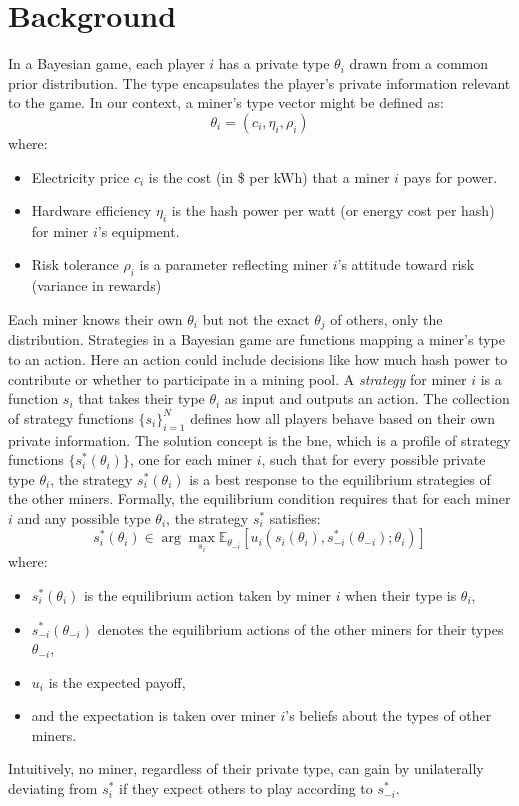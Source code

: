 \documentclass[12pt]{article}
\begin{document}

\section{Background}
In a Bayesian game, each player $i$ has a private type $\theta_i$ drawn from a common prior distribution. The type encapsulates the player's private information relevant to the game. In our context, a miner's type vector might be defined as:
\begin{equation}
	\theta_i=(c_i, \eta_i, \rho_i)
\end{equation}
where:
\begin{itemize}
	\item Electricity price $c_i$ is the cost (in \$ per kWh) that a miner $i$ pays for power.
	\item Hardware efficiency $\eta_i$ is the hash power per watt (or energy cost per hash) for miner $i$'s equipment.
	\item Risk tolerance $\rho_i$ is a parameter reflecting miner $i$'s attitude toward risk (variance in rewards)
\end{itemize}
Each miner knows their own $\theta_i$ but not the exact $\theta_j$ of others, only the distribution. Strategies in a Bayesian game are functions mapping a miner's type to an action. Here an action could include decisions like how much hash power to contribute or whether to participate in a mining pool. A \emph{strategy} for miner $i$ is a function $s_i$ that takes their type $\theta_i$ as input and outputs an action. The collection of strategy functions $\{s_i\}_{i=1}^N$ defines how all players behave based on their own private information. The solution concept is the \gls{bne}, which is a profile of strategy functions $\{s_i^*(\theta_i)\}$, one for each miner $i$, such that for every possible private type $\theta_i$, the strategy $s_i^*(\theta_i)$ is a best response to the equilibrium strategies of the other miners. Formally, the equilibrium condition requires that for each miner $i$ and any possible type $\theta_i$, the strategy $s_i^*$ satisfies:
\begin{equation}
	s_i^*(\theta_i) \in \arg\max_{s_i} \mathbb{E}_{\theta_{-i}} \left[ u_i(s_i(\theta_i), s_{-i}^*(\theta_{-i}); \theta_i) \right]
\end{equation}
where:
\begin{itemize}
	\item $s_i^*(\theta_i)$ is the equilibrium action taken by miner $i$ when their type is $\theta_i$,
	\item $s_{-i}^*(\theta_{-i})$ denotes the equilibrium actions of the other miners for their types $\theta_{-i}$,
	\item $u_i$ is the expected payoff,
	\item and the expectation is taken over miner $i$'s beliefs about the types of other miners.
\end{itemize}
Intuitively, no miner, regardless of their private type, can gain by unilaterally deviating from $s_i^*$ if they expect others to play according to $s_{-i}^*$.
\end{document}
